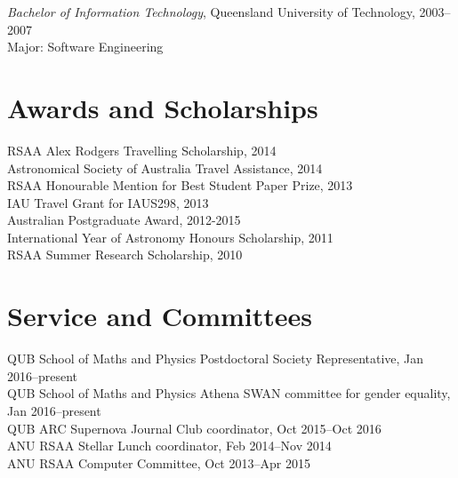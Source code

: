 \documentclass[11pt]{res} %
\begin{document}
\begin{resume}

  {\it Bachelor of Information Technology}, Queensland University of Technology, 2003--2007\\
  Major: Software Engineering

\section{Awards and Scholarships}
  RSAA Alex Rodgers Travelling Scholarship, 2014\\
  Astronomical Society of Australia Travel Assistance, 2014\\
  RSAA Honourable Mention for Best Student Paper Prize, 2013\\
  IAU Travel Grant for IAUS298, 2013\\
  Australian Postgraduate Award, 2012-2015\\
  International Year of Astronomy Honours Scholarship, 2011\\
  RSAA Summer Research Scholarship, 2010

\section{Service and Committees}
	QUB School of Maths and Physics Postdoctoral Society Representative, Jan 2016--present\\
	QUB School of Maths and Physics Athena SWAN committee for gender equality, Jan 2016--present\\
	QUB ARC Supernova Journal Club coordinator, Oct 2015--Oct 2016\\
	ANU RSAA Stellar Lunch coordinator, Feb 2014--Nov 2014\\
	ANU RSAA Computer Committee, Oct 2013--Apr 2015


\end{resume}
\end{document}
